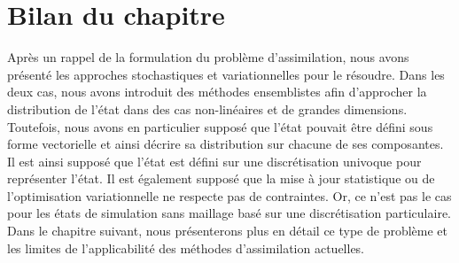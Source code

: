 \section{Bilan du chapitre}

Après un rappel de la formulation du problème d’assimilation, nous avons présenté les approches stochastiques et variationnelles pour le résoudre. Dans les deux cas, nous avons introduit des méthodes ensemblistes afin d'approcher la distribution de l'état dans des cas non-linéaires et de grandes dimensions. Toutefois, nous avons en particulier supposé que l'état pouvait être défini sous forme vectorielle et ainsi décrire sa distribution sur chacune de ses composantes. Il est ainsi supposé que l'état est défini sur une discrétisation univoque pour représenter l'état. Il est également supposé que la mise à jour statistique ou de l'optimisation variationnelle ne respecte pas de contraintes. Or, ce n'est pas le cas pour les états de simulation sans maillage basé sur une discrétisation particulaire. Dans le chapitre suivant, nous présenterons plus en détail ce type de problème et les limites de l'applicabilité des méthodes d'assimilation actuelles.

